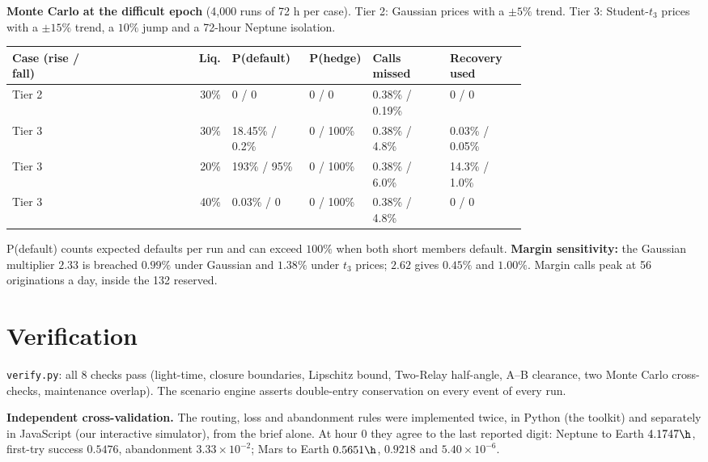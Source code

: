 \textbf{Monte Carlo at the difficult epoch} (4{,}000 runs of 72 h per case). Tier 2: Gaussian prices with a $\pm5\%$ trend. Tier 3: Student-$t_3$ prices with a $\pm15\%$ trend, a $10\%$ jump and a 72-hour Neptune isolation.
\begin{table}[H]
\centering
\small
\begin{tabular}{@{}p{0.17\linewidth}rp{0.15\linewidth}p{0.12\linewidth}p{0.15\linewidth}p{0.15\linewidth}@{}}
\toprule
Case (rise / fall) & Liq. & P(default) & P(hedge) & Calls missed & Recovery used \\
\midrule
Tier 2 & 30\% & 0 / 0 & 0 / 0 & 0.38\% / 0.19\% & 0 / 0 \\
Tier 3 & 30\% & 18.45\% / 0.2\% & 0 / 100\% & 0.38\% / 4.8\% & 0.03\% / 0.05\% \\
Tier 3 & 20\% & 193\% / 95\% & 0 / 100\% & 0.38\% / 6.0\% & 14.3\% / 1.0\% \\
Tier 3 & 40\% & 0.03\% / 0 & 0 / 100\% & 0.38\% / 4.8\% & 0 / 0 \\
\bottomrule
\end{tabular}
\end{table}
P(default) counts expected defaults per run and can exceed $100\%$ when both short members default. \textbf{Margin sensitivity:} the Gaussian multiplier $2.33$ is breached $0.99\%$ under Gaussian and $1.38\%$ under $t_3$ prices; $2.62$ gives $0.45\%$ and $1.00\%$. Margin calls peak at 56 originations a day, inside the 132 reserved.

\section{Verification}\label{app:verify}
\texttt{verify.py}: all 8 checks pass (light-time, closure boundaries, Lipschitz bound, Two-Relay half-angle, A--B clearance, two Monte Carlo cross-checks, maintenance overlap). The scenario engine asserts double-entry conservation on every event of every run.

\textbf{Independent cross-validation.} The routing, loss and abandonment rules were implemented twice, in Python (the toolkit) and separately in JavaScript (our interactive simulator), from the brief alone. At hour 0 they agree to the last reported digit: Neptune to Earth $4.1747\h$, first-try success $0.5476$, abandonment $3.33\times10^{-2}$; Mars to Earth $0.5651\h$, $0.9218$ and $5.40\times10^{-6}$.

